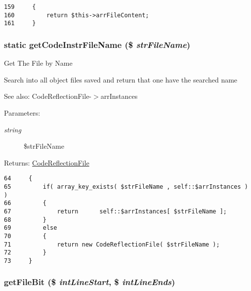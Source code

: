 \begin{Code}\begin{verbatim}159     {
160         return $this->arrFileContent;
161     }
\end{verbatim}
\end{Code}


\hypertarget{class_code_reflection_file_812ea520bce2f3c079e273a0db5c2583}{
\subsubsection[{getCodeInstrFileName}]{\setlength{\rightskip}{0pt plus 5cm}static getCodeInstrFileName (\$ {\em strFileName})}}
\label{class_code_reflection_file_812ea520bce2f3c079e273a0db5c2583}


Get The File by Name

Search into all object files saved and return that one have the searched name

\begin{Desc}
\item[See also:]CodeReflectionFile-$>$arrInstances \end{Desc}
\begin{Desc}
\item[Parameters:]
\begin{description}
\item[{\em string}]\$strFileName \end{description}
\end{Desc}
\begin{Desc}
\item[Returns:]\hyperlink{class_code_reflection_file}{CodeReflectionFile} \end{Desc}


\begin{Code}\begin{verbatim}64     {
65         if( array_key_exists( $strFileName , self::$arrInstances ) )
66         {
67             return      self::$arrInstances[ $strFileName ];
68         }
69         else
70         {
71             return new CodeReflectionFile( $strFileName );
72         }
73     }
\end{verbatim}
\end{Code}


\hypertarget{class_code_reflection_file_733f07a956daf8b051ebe61b49d69ce9}{
\subsubsection[{getFileBit}]{\setlength{\rightskip}{0pt plus 5cm}getFileBit (\$ {\em intLineStart}, \/  \$ {\em intLineEnds})}}
\label{class_code_reflection_file_733f07a956daf8b051ebe61b49d69ce9}


